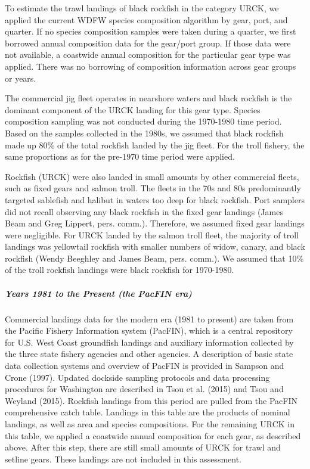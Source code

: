 \documentclass[11pt,
  english,
  letterpaper,
]{article}
\begin{document}
To estimate the trawl landings of black rockfish in the category URCK, we applied the current WDFW species composition algorithm by gear, port, and quarter. If no species composition samples were taken during a quarter, we first borrowed annual composition data for the gear/port group. If those data were not available, a coastwide annual composition for the particular gear type was applied. There was no borrowing of composition information across gear groups or years.

The commercial jig fleet operates in nearshore waters and black rockfish is the dominant component of the URCK landing for this gear type. Species composition sampling was not conducted during the 1970-1980 time period. Based on the samples collected in the 1980s, we assumed that black rockfish made up 80\% of the total rockfish landed by the jig fleet. For the troll fishery, the same proportions as for the pre-1970 time period were applied.

Rockfish (URCK) were also landed in small amounts by other commercial fleets, such as fixed gears and salmon troll. The fleets in the 70s and 80s predominantly targeted sablefish and halibut in waters too deep for black rockfish. Port samplers did not recall observing any black rockfish in the fixed gear landings (James Beam and Greg Lippert, pers. comm.). Therefore, we assumed fixed gear landings were negligible. For URCK landed by the salmon troll fleet, the majority of troll landings was yellowtail rockfish with smaller numbers of widow, canary, and black rockfish (Wendy Beeghley and James Beam, pers. comm.). We assumed that 10\% of the troll rockfish landings were black rockfish for 1970-1980.

\hypertarget{years-1981-to-the-present-the-pacfin-era}{%
\subparagraph{Years 1981 to the Present (the PacFIN era)}\label{years-1981-to-the-present-the-pacfin-era}}

Commercial landings data for the modern era (1981 to present) are taken from the Pacific Fishery Information system (PacFIN), which is a central repository for U.S. West Coast groundfish landings and auxiliary information collected by the three state fishery agencies and other agencies. A description of basic state data collection systems and overview of PacFIN is provided in Sampson and Crone (1997). Updated dockside sampling protocols and data processing procedures for Washington are described in Tsou et al. (2015) and Tsou and Weyland (2015). Rockfish landings from this period are pulled from the PacFIN comprehensive catch table. Landings in this table are the products of nominal landings, as well as area and species compositions. For the remaining URCK in this table, we applied a coastwide annual composition for each gear, as described above. After this step, there are still small amounts of URCK for trawl and setline gears. These landings are not included in this assessment.
\end{document}
